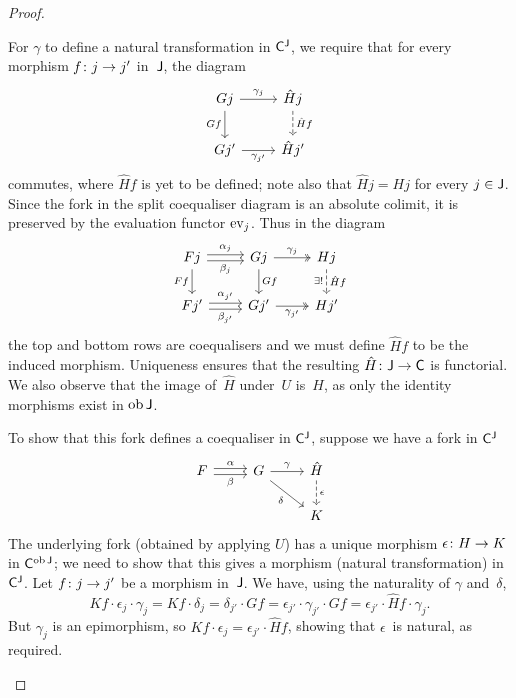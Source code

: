 \documentclass[../../solutions]{subfiles}
\begin{document}
\begin{proof}
\begin{enumerate}[label=(\roman*)]
    For $\gamma$ to define a natural transformation in ${\mathsf{C}}^{\mathsf{J}}$, we
    require that for every morphism ${f}\colon{j}\to{j'}$ in~${\mathsf{J}}$, the
    diagram
    $$
    \begin{tikzcd}
      Gj \ar[r, "\gamma_j"] \ar[d, "Gf"']
      & \hat Hj \ar[d, dashed, "\hat Hf"]
      \\
      Gj' \ar[r, "\gamma_{j'}"']
      & \hat Hj'
    \end{tikzcd}
    $$
    commutes, where $\hat Hf$ is yet to be defined; note also that
    $\hat Hj=Hj$ for every $j\in{\mathsf{J}}$.  Since the fork in the split
    coequaliser diagram is an absolute colimit, it is preserved by the
    evaluation functor $\operatorname{ev}_j$.  Thus in the diagram
    $$
    \begin{tikzcd}
      Fj
      \ar[r, shift left=0.5ex, "\alpha_j"]
      \ar[r, shift right=0.5ex, "\beta_j"']
      \ar[d, "Ff"']
      & Gj
      \ar[r, twoheadrightarrow, "\gamma_j"]
      \ar[d, "Gf"]
      & Hj
      \ar[d, dashed, "\exists!\vphantom{f}"', "\hat Hf"]
      \\
      Fj'
      \ar[r, shift left=0.5ex, "\alpha_{j'}"]
      \ar[r, shift right=0.5ex, "\beta_{j'}"']
      & Gj'
      \ar[r, twoheadrightarrow, "\gamma_{j'}"']
      & Hj'
    \end{tikzcd}
    $$
    the top and bottom rows are coequalisers and we must define
    $\hat Hf$ to be the induced morphism.  Uniqueness ensures that the
    resulting ${\hat H}\colon{{\mathsf{J}}}\to{{\mathsf{C}}}$ is functorial.  We also
    observe that the image of~$\hat H$ under~$U$ is~$H$, as only the
    identity morphisms exist in $\operatorname{ob}{\mathsf{J}}$.
    
    To show that this fork defines a coequaliser in ${\mathsf{C}}^{\mathsf{J}}$, suppose
    we have a fork in ${\mathsf{C}}^{\mathsf{J}}$
    $$
    \begin{tikzcd}
      F
      \ar[r, shift left=0.5ex, "\alpha"]
      \ar[r, shift right=0.5ex, "\beta"']
      & G
      \ar[r, "\gamma"]
      \ar[dr, "\delta"']
      & \hat H
      \ar[d, dashed, "\epsilon"]
      \\
      && K
    \end{tikzcd}
    $$
    The underlying fork (obtained by applying $U$) has a unique
    morphism ${\epsilon}\colon{H}\to{K}$ in ${\mathsf{C}}^{\operatorname{ob}{\mathsf{J}}}$; we need to
    show that this gives a morphism (natural transformation)
    in~${\mathsf{C}}^{\mathsf{J}}$.  Let ${f}\colon{j}\to{j'}$ be a morphism in~${\mathsf{J}}$.  We
    have, using the naturality of $\gamma$ and~$\delta$,
    $$Kf\cdot \epsilon_j \cdot \gamma_j = Kf\cdot \delta_j =
    \delta_{j'}\cdot Gf = \epsilon_{j'} \cdot \gamma_{j'} \cdot Gf =
    \epsilon_{j'} \cdot \hat Hf \cdot \gamma_j.$$ But $\gamma_j$ is an
    epimorphism, so $Kf\cdot \epsilon_j = \epsilon_{j'}\cdot \hat Hf$,
    showing that $\epsilon$~is natural, as required.
  \end{enumerate}
\end{proof}
\end{document}
